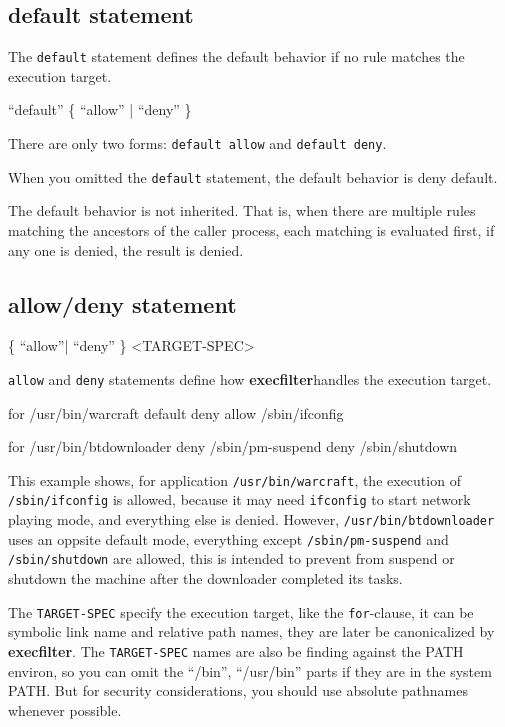\documentclass[hyperref, bookmark]{z-article}
\newcommand\code[1]{\texttt{#1}}
\newcommand\xfilt{\textbf{execfilter}}
\begin{document}
\subsection {default statement}

The \code{default} statement defines the default behavior if no rule matches the
execution target.

\begin{syntax}
  ``default'' \{ ``allow'' | ``deny'' \}
\end{syntax}

There are only two forms: \code{default allow} and \code{default deny}.

When you omitted the \code{default} statement, the default behavior is deny
default.

The default behavior is not inherited. That is, when there are multiple rules
matching the ancestors of the caller process, each matching is evaluated first,
if any one is denied, the result is denied.

\subsection {allow/deny statement}

\begin{syntax}
  \{ ``allow''| ``deny'' \} <TARGET-SPEC>
\end{syntax}

\code{allow} and \code{deny} statements define how \xfilt handles the execution target.

\begin{codeblk}
  for /usr/bin/warcraft
    default deny
    allow /sbin/ifconfig

  for /usr/bin/btdownloader
    deny /sbin/pm-suspend
    deny /sbin/shutdown
\end{codeblk}

This example shows, for application \code{/usr/bin/warcraft}, the execution of
\code{/sbin/ifconfig} is allowed, because it may need \code{ifconfig} to start
network playing mode, and everything else is denied.  However,
\code{/usr/bin/btdownloader} uses an oppsite default mode, everything except
\code{/sbin/pm-suspend} and \code{/sbin/shutdown} are allowed, this is intended
to prevent from suspend or shutdown the machine after the downloader completed
its tasks.

The \code{TARGET-SPEC} specify the execution target, like the \code{for}-clause,
it can be symbolic link name and relative path names, they are later be
canonicalized by \xfilt. The \code{TARGET-SPEC} names are also be finding
against the PATH environ, so you can omit the ``/bin'', ``/usr/bin'' parts if
they are in the system PATH.  But for security considerations, you should use
absolute pathnames whenever possible.
\end{document}
